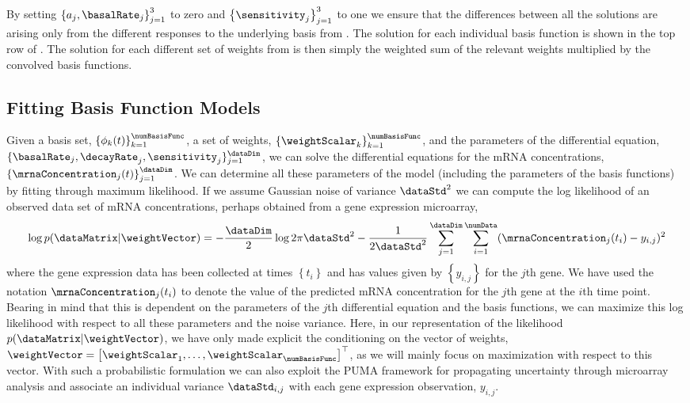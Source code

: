\documentclass{article}
\begin{document}
By setting $\left\{a_j, \basalRate_j\right\}_{j=1}^3$ to zero and
$\left\{\sensitivity_j\right\}_{j=1}^3$ to one we ensure that the
differences between all the solutions are arising only from the
different responses to the underlying basis from
. The solution for each individual basis
function is shown in the top row of
. The solution for each different set of weights from  is then simply the weighted sum of the relevant weights multiplied by the convolved basis functions.

\subsection{Fitting Basis Function Models}

Given a basis set, $\left\{\phi_k(t)\right\}_{k=1}^\numBasisFunc$, a
set of weights, $\left\{\weightScalar_k\right\}_{k=1}^\numBasisFunc$,
and the parameters of the differential equation, $\{\basalRate_j,
\decayRate_j, \sensitivity_j\}_{j=1}^\dataDim$, we can solve the
differential equations for the mRNA concentrations,
$\left\{\mrnaConcentration_j(t)\right\}_{j=1}^\dataDim$. We can
determine all these parameters of the model (including the parameters
of the basis functions) by fitting through maximum likelihood. If we
assume Gaussian noise of variance $\dataStd^2$ we can compute the log
likelihood of an observed data set of mRNA concentrations, perhaps
obtained from a gene expression microarray,
\[
\log p(\dataMatrix|\weightVector) = -\frac{\dataDim}{2}\log 2\pi\dataStd^2 -\frac{1}{2\dataStd^2}\sum_{j=1}^\dataDim \sum_{i=1}^\numData(\mrnaConcentration_j(t_i) - y_{i,j})^2
\]
where the gene expression data has been collected at times
$\left\{t_i\right\}$ and has values given by $\left\{y_{i,j}\right\}$
for the $j$th gene. We have used the notation
$\mrnaConcentration_j(t_i)$ to denote the value of the predicted mRNA
concentration for the $j$th gene at the $i$th time point. Bearing in
mind that this is dependent on the parameters of the $j$th
differential equation and the basis functions, we can maximize this
log likelihood with respect to all these parameters and the noise
variance. Here, in our representation of the likelihood $p(\dataMatrix|\weightVector)$, we have only made explicit the conditioning on the vector of weights,  $\weightVector=\left[\weightScalar_1,\dots,\weightScalar_\numBasisFunc\right]^\top$, as we will mainly focus on maximization with respect to this vector. With such a probabilistic formulation we can also exploit
the PUMA \citep{Milo:probabilistic03,Liu:tractable04} framework for
propagating uncertainty through microarray analysis and associate an
individual variance $\dataStd_{i,j}$ with each gene expression
observation, $y_{i,j}$. 
\end{document}
